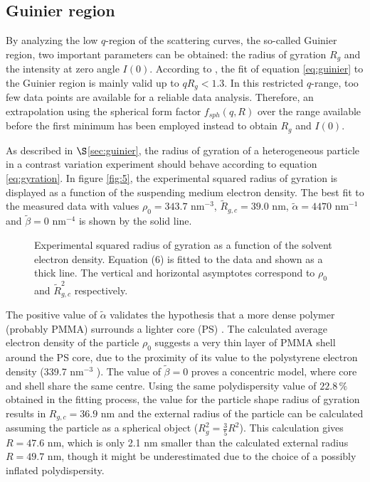 \subsection{Guinier region}
By analyzing the low \(q \)-region of the scattering curves, the so-called Guinier region, two important parameters can be obtained: the radius of gyration \(R_g\) and the intensity at zero angle \(I(0)\). According to \cite{Feigin1987}, the fit of equation \eqref{eq:guinier} to the Guinier region is mainly valid up to \( qR_g<1.3 \). In this restricted \(q\)-range, too few data points are available for a reliable data analysis. Therefore, an extrapolation using the spherical form factor \( f_{sph}(q,R) \) over the range available before the first minimum has been employed instead to obtain \(R_g\) and \(I(0)\).

As described in \(\S\)\ref{sec:guinier}, the radius of gyration of a heterogeneous particle in a contrast variation experiment should behave according to equation \eqref{eq:gyration}. In figure \ref{fig:5}, the experimental squared radius of gyration is displayed as a function of the suspending medium electron density. The best fit to the measured data with values \(\rho_0=343.7\) nm\(^{-3}\), \( \tilde R_{g,c}=39.0\) nm, \(\tilde \alpha=4470\) nm\(^{-1}\) and \(\tilde\beta=0\) nm\(^{-4}\) is shown by the solid line. 

\begin{figure}%
	\centering
		
		\caption{Experimental squared radius of gyration as a function of the solvent electron density. Equation (6) is fitted to the data and shown as a thick line. The vertical and horizontal asymptotes correspond to $\rho_0$ and $\tilde R^2_{g,c}$ respectively.}
		\label{fig:KiskerGuinierRadius}
\end{figure}

The positive value of \(\tilde\alpha\) validates the hypothesis that a more dense polymer (probably PMMA) surrounds a lighter core (PS) \cite{Stuhrmann2008}. The calculated average electron density of the particle \(\rho_0\) suggests a very thin layer of PMMA shell around the PS core, due to the proximity of its value to the polystyrene electron density (339.7 nm\(^{-3}\) ). The value of \( \tilde\beta=0\) proves a concentric model, where core and shell share the same centre. Using the same polydispersity value of \(22.8\,\%\) obtained in the fitting process, the value for the particle shape radius of gyration results in \(R_{g,c}=36.9\) nm and the external radius of the particle can be calculated assuming the particle as a spherical object (\( R_g^2=\frac{3}{5}R^2 \)). This calculation gives \( R=47.6\) nm, which is only 2.1 nm smaller than the calculated external radius \(R=49.7\) nm, though it might be underestimated due to the choice of a possibly inflated polydispersity. 

